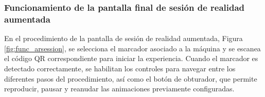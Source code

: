         \subsubsection{Funcionamiento de la pantalla final de sesión de realidad aumentada}

            En el procedimiento de la pantalla de sesión de realidad aumentada, Figura \ref{fig:func_arsession}, se selecciona el marcador asociado a la máquina y se escanea el código QR correspondiente para iniciar la experiencia. Cuando el marcador es detectado correctamente, se habilitan los controles para navegar entre los diferentes pasos del procedimiento, así como el botón de obturador, que permite reproducir, pausar y reanudar las animaciones previamente configuradas.

            